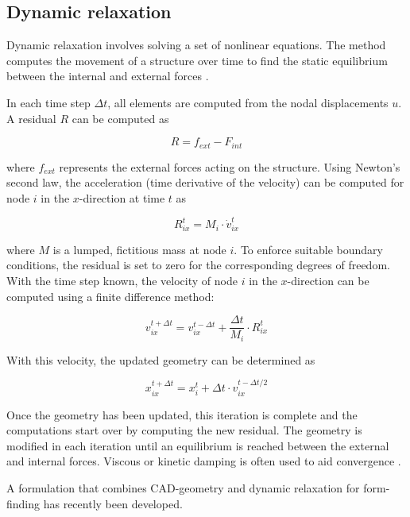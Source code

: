 \subsection{Dynamic relaxation}
\label{sec:dr}
Dynamic relaxation involves solving a set of nonlinear equations. The method computes the movement of a structure over time to find the static equilibrium between the internal and external forces \cite{Day1965, barnes1988form}. 

In each time step  $\Delta t$, all elements are computed from the nodal displacements $u$. A residual $R$ can be computed as

\begin{equation*}
  R = f_{ext} - F_{int} 
\end{equation*}

where $f_{ext}$ represents the external forces acting on the structure. Using Newton’s second law, the acceleration (time derivative of the velocity) can be computed for node $i$ in the $x$-direction at time $t$ as

\begin{equation*}
  R^t_{ix} = M_i  \cdot \dot{v}^t_{ix}
\end{equation*}

where $M$  is a lumped, fictitious mass at node $i$. To enforce suitable boundary conditions, the residual is set to zero for the corresponding degrees of freedom. With the time step known, the velocity of node $i$ in the $x$-direction can be computed using a finite difference method:

\begin{equation*}
  v^{t+\Delta t}_{ix} = v^{t-\Delta t}_{ix} + \frac{\Delta t}{M_i} \cdot R^t_{ix}
\end{equation*}

With this velocity, the updated geometry can be determined as

\begin{equation*}
  x^{t+\Delta t}_{ix} = x^t_i + \Delta t \cdot v_{ix}^{t-\Delta t / 2}
\end{equation*}

Once the geometry has been updated, this iteration is complete and the computations start over by computing the new residual. The geometry is modified in each iteration until an equilibrium is reached between the external and internal forces. Viscous or kinetic damping is often used to aid convergence \cite{barnes1988form}.

A formulation that combines CAD-geometry and dynamic relaxation \cite{Alic2015} for form-finding has recently been developed.

